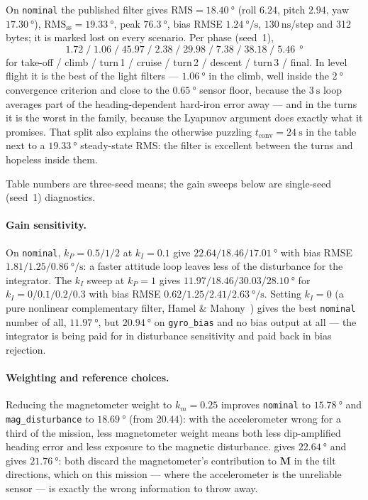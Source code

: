On \texttt{nominal} the published filter gives $\text{RMS}=\SI{18.40}{\degree}$ (roll $6.24$,
pitch $2.94$, yaw $\SI{17.30}{\degree}$), $\text{RMS}_{\text{ss}}=\SI{19.33}{\degree}$, peak
$\SI{76.3}{\degree}$, bias RMSE $\SI{1.24}{\degree\per\second}$, $\SI{130}{\nano\second}$/step and
312\,bytes; it is marked lost on every scenario. Per phase (seed~1),
\[
1.72\;/\;1.06\;/\;\mathbf{45.97}\;/\;2.38\;/\;\mathbf{29.98}\;/\;7.38\;/\;\mathbf{38.18}\;/\;5.46
\ \SI{}{\degree}
\]
for take-off / climb / turn\,1 / cruise / turn\,2 / descent / turn\,3 / final. In level flight it is
the best of the light filters --- $\SI{1.06}{\degree}$ in the climb, well inside the
$\SI{2}{\degree}$ convergence criterion and close to the $\SI{0.65}{\degree}$ sensor floor, because
the $\SI{3}{\second}$ loop averages part of the heading-dependent hard-iron error away --- and in
the turns it is the worst in the family, because the Lyapunov argument does exactly what it
promises. That split also explains the otherwise puzzling $t_{\text{conv}}=\SI{24}{\second}$ in the
table next to a $\SI{19.33}{\degree}$ steady-state RMS: the filter is excellent between the turns
and hopeless inside them.

Table numbers are three-seed means; the gain sweeps below are single-seed (seed~1) diagnostics.

\paragraph{Gain sensitivity.} On \texttt{nominal}, $k_P=0.5/1/2$ at $k_I=0.1$ give
$22.64/18.46/\SI{17.01}{\degree}$ with bias RMSE $1.81/1.25/\SI{0.86}{\degree\per\second}$: a faster
attitude loop leaves less of the disturbance for the integrator. The $k_I$ sweep at $k_P=1$ gives
$11.97/18.46/30.03/\SI{28.10}{\degree}$ for $k_I=0/0.1/0.2/0.3$ with bias RMSE
$0.62/1.25/2.41/\SI{2.63}{\degree\per\second}$. Setting $k_I=0$ (a pure nonlinear complementary
filter, Hamel \& Mahony~\cite{hamel2006}) gives the best \texttt{nominal} number of all,
$\SI{11.97}{\degree}$, but $\SI{20.94}{\degree}$ on \texttt{gyro\_bias} and no bias output at all ---
the integrator is being paid for in disturbance sensitivity and paid back in bias rejection.

\paragraph{Weighting and reference choices.} Reducing the magnetometer weight to $k_m=0.25$ improves
\texttt{nominal} to $\SI{15.78}{\degree}$ and \texttt{mag\_disturbance} to $\SI{18.69}{\degree}$
(from $20.44$): with the accelerometer wrong for a third of the mission, less magnetometer weight
means both less dip-amplified heading error and less exposure to the magnetic disturbance.
 gives $\SI{22.64}{\degree}$ and  gives
$\SI{21.76}{\degree}$: both discard the magnetometer's contribution to $\bm{M}$ in the tilt
directions, which on this mission --- where the accelerometer is the unreliable sensor --- is
exactly the wrong information to throw away.

